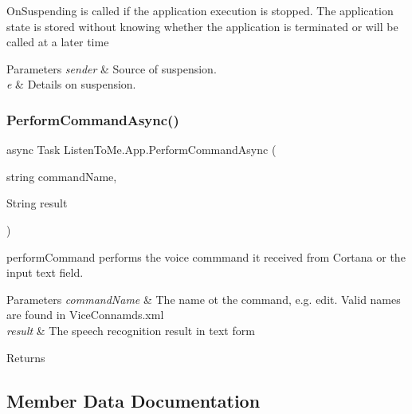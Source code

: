 On\+Suspending is called if the application execution is stopped. The application state is stored without knowing whether the application is terminated or will be called at a later time 


\begin{DoxyParams}{Parameters}
{\em sender} & Source of suspension.\\
\hline
{\em e} & Details on suspension.\\
\hline
\end{DoxyParams}
\mbox{\label{class_listen_to_me_1_1_app_aaf710baa7ee4fb8e6da7e97a333e6e8c}} 
\subsubsection{\texorpdfstring{Perform\+Command\+Async()}{PerformCommandAsync()}}
{\footnotesize\ttfamily async Task Listen\+To\+Me.\+App.\+Perform\+Command\+Async (\begin{DoxyParamCaption}\item[{string}]{command\+Name,  }\item[{String}]{result }\end{DoxyParamCaption})\hspace{0.3cm}{\ttfamily [private]}}



perform\+Command performs the voice commmand it received from Cortana or the input text field. 


\begin{DoxyParams}{Parameters}
{\em command\+Name} & The name ot the command, e.\+g. edit. Valid names are found in Vice\+Connamds.\+xml\\
\hline
{\em result} & The speech recognition result in text form\\
\hline
\end{DoxyParams}
\begin{DoxyReturn}{Returns}

\end{DoxyReturn}


\subsection{Member Data Documentation}
\mbox{\label{class_listen_to_me_1_1_app_a2862b032c76095016dd7dc7600bfd029}} 
